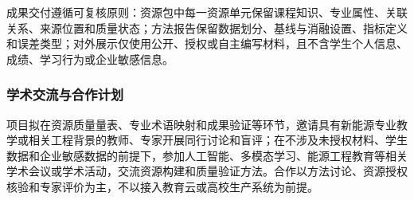 成果交付遵循可复核原则：资源包中每一资源单元保留课程知识、专业属性、关联关系、来源位置和质量状态；方法报告保留数据划分、基线与消融设置、指标定义和误差类型；对外展示仅使用公开、授权或自主编写材料，且不含学生个人信息、成绩、学习行为或企业敏感信息。

\subsubsection{学术交流与合作计划}

项目拟在资源质量量表、专业术语映射和成果验证等环节，邀请具有新能源专业教学或相关工程背景的教师、专家开展同行讨论和盲评；在不涉及未授权材料、学生数据和企业敏感数据的前提下，参加人工智能、多模态学习、能源工程教育等相关学术会议或学术活动，交流资源构建和质量验证方法。合作以方法讨论、资源授权核验和专家评价为主，不以接入教育云或高校生产系统为前提。
